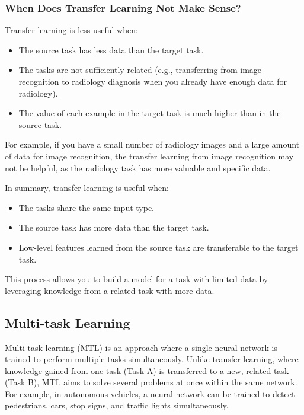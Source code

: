 \documentclass[letterpaper,12pt,notitlepage,twoside]{report}
\begin{document}
\subsubsection*{When Does Transfer Learning Not Make Sense?}
Transfer learning is less useful when:
\begin{itemize}[nosep]
    \item The source task has less data than the target task.
    \item The tasks are not sufficiently related (e.g., transferring from image recognition to radiology diagnosis when you already have enough data for radiology).
    \item The value of each example in the target task is much higher than in the source task.
\end{itemize}
For example, if you have a small number of radiology images and a large amount of data for image recognition, the transfer learning from image recognition may not be helpful, as the radiology task has more valuable and specific data.

In summary, transfer learning is useful when:
\begin{itemize}[nosep]
    \item The tasks share the same input type.
    \item The source task has more data than the target task.
    \item Low-level features learned from the source task are transferable to the target task.
\end{itemize}
This process allows you to build a model for a task with limited data by leveraging knowledge from a related task with more data.


\subsection*{Multi-task Learning}
Multi-task learning (MTL) is an approach where a single neural network is trained to perform multiple tasks simultaneously. Unlike transfer learning, where knowledge gained from one task (Task A) is transferred to a new, related task (Task B), MTL aims to solve several problems at once within the same network. For example, in autonomous vehicles, a neural network can be trained to detect pedestrians, cars, stop signs, and traffic lights simultaneously.
\end{document}
